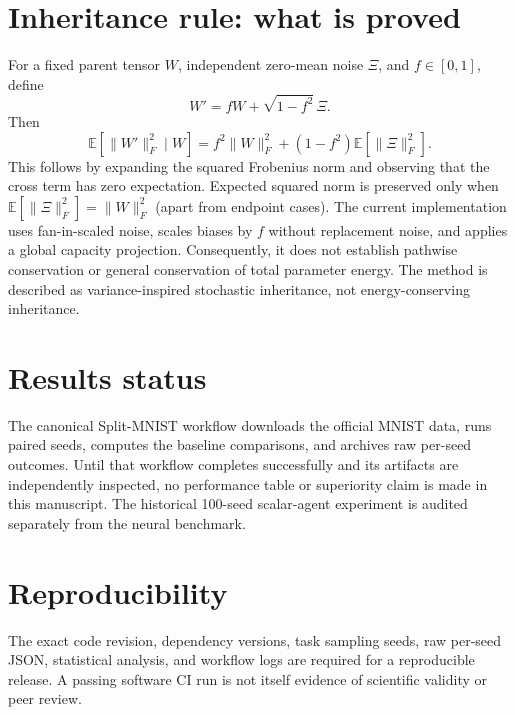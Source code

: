 \documentclass[11pt,a4paper]{article}
\begin{document}
\section{Inheritance rule: what is proved}
For a fixed parent tensor $W$, independent zero-mean noise $\Xi$, and $f\in[0,1]$, define
\[
W'=fW+\sqrt{1-f^2}\,\Xi.
\]
Then
\[
\mathbb{E}[\|W'\|_F^2\mid W]
=f^2\|W\|_F^2+(1-f^2)\mathbb{E}[\|\Xi\|_F^2].
\]
This follows by expanding the squared Frobenius norm and observing that the cross term has zero expectation. Expected squared norm is preserved only when $\mathbb{E}[\|\Xi\|_F^2]=\|W\|_F^2$ (apart from endpoint cases). The current implementation uses fan-in-scaled noise, scales biases by $f$ without replacement noise, and applies a global capacity projection. Consequently, it does not establish pathwise conservation or general conservation of total parameter energy. The method is described as variance-inspired stochastic inheritance, not energy-conserving inheritance.

\section{Results status}
The canonical Split-MNIST workflow downloads the official MNIST data, runs paired seeds, computes the baseline comparisons, and archives raw per-seed outcomes. Until that workflow completes successfully and its artifacts are independently inspected, no performance table or superiority claim is made in this manuscript. The historical 100-seed scalar-agent experiment is audited separately from the neural benchmark.

\section{Reproducibility}
The exact code revision, dependency versions, task sampling seeds, raw per-seed JSON, statistical analysis, and workflow logs are required for a reproducible release. A passing software CI run is not itself evidence of scientific validity or peer review.
\end{document}
